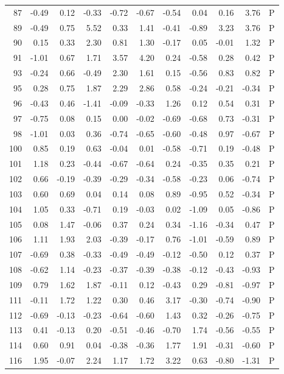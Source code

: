 \begin{table}[ht]
\begin{tabular}{rrrrrrrrrrl}
  87 & -0.49 & 0.12 & -0.33 & -0.72 & -0.67 & -0.54 & 0.04 & 0.16 & 3.76 & P \\ 
  89 & -0.49 & 0.75 & 5.52 & 0.33 & 1.41 & -0.41 & -0.89 & 3.23 & 3.76 & P \\ 
  90 & 0.15 & 0.33 & 2.30 & 0.81 & 1.30 & -0.17 & 0.05 & -0.01 & 1.32 & P \\ 
  91 & -1.01 & 0.67 & 1.71 & 3.57 & 4.20 & 0.24 & -0.58 & 0.28 & 0.42 & P \\ 
  93 & -0.24 & 0.66 & -0.49 & 2.30 & 1.61 & 0.15 & -0.56 & 0.83 & 0.82 & P \\ 
  95 & 0.28 & 0.75 & 1.87 & 2.29 & 2.86 & 0.58 & -0.24 & -0.21 & -0.34 & P \\ 
  96 & -0.43 & 0.46 & -1.41 & -0.09 & -0.33 & 1.26 & 0.12 & 0.54 & 0.31 & P \\ 
  97 & -0.75 & 0.08 & 0.15 & 0.00 & -0.02 & -0.69 & -0.68 & 0.73 & -0.31 & P \\ 
  98 & -1.01 & 0.03 & 0.36 & -0.74 & -0.65 & -0.60 & -0.48 & 0.97 & -0.67 & P \\ 
  100 & 0.85 & 0.19 & 0.63 & -0.04 & 0.01 & -0.58 & -0.71 & 0.19 & -0.48 & P \\ 
  101 & 1.18 & 0.23 & -0.44 & -0.67 & -0.64 & 0.24 & -0.35 & 0.35 & 0.21 & P \\ 
  102 & 0.66 & -0.19 & -0.39 & -0.29 & -0.34 & -0.58 & -0.23 & 0.06 & -0.74 & P \\ 
  103 & 0.60 & 0.69 & 0.04 & 0.14 & 0.08 & 0.89 & -0.95 & 0.52 & -0.34 & P \\ 
  104 & 1.05 & 0.33 & -0.71 & 0.19 & -0.03 & 0.02 & -1.09 & 0.05 & -0.86 & P \\ 
  105 & 0.08 & 1.47 & -0.06 & 0.37 & 0.24 & 0.34 & -1.16 & -0.34 & 0.47 & P \\ 
  106 & 1.11 & 1.93 & 2.03 & -0.39 & -0.17 & 0.76 & -1.01 & -0.59 & 0.89 & P \\ 
  107 & -0.69 & 0.38 & -0.33 & -0.49 & -0.49 & -0.12 & -0.50 & 0.12 & 0.37 & P \\ 
  108 & -0.62 & 1.14 & -0.23 & -0.37 & -0.39 & -0.38 & -0.12 & -0.43 & -0.93 & P \\ 
  109 & 0.79 & 1.62 & 1.87 & -0.11 & 0.12 & -0.43 & 0.29 & -0.81 & -0.97 & P \\ 
  111 & -0.11 & 1.72 & 1.22 & 0.30 & 0.46 & 3.17 & -0.30 & -0.74 & -0.90 & P \\ 
  112 & -0.69 & -0.13 & -0.23 & -0.64 & -0.60 & 1.43 & 0.32 & -0.26 & -0.75 & P \\ 
  113 & 0.41 & -0.13 & 0.20 & -0.51 & -0.46 & -0.70 & 1.74 & -0.56 & -0.55 & P \\ 
  114 & 0.60 & 0.91 & 0.04 & -0.38 & -0.36 & 1.77 & 1.91 & -0.31 & -0.60 & P \\ 
  116 & 1.95 & -0.07 & 2.24 & 1.17 & 1.72 & 3.22 & 0.63 & -0.80 & -1.31 & P \\ 
   \hline
\end{tabular}
\end{table}
